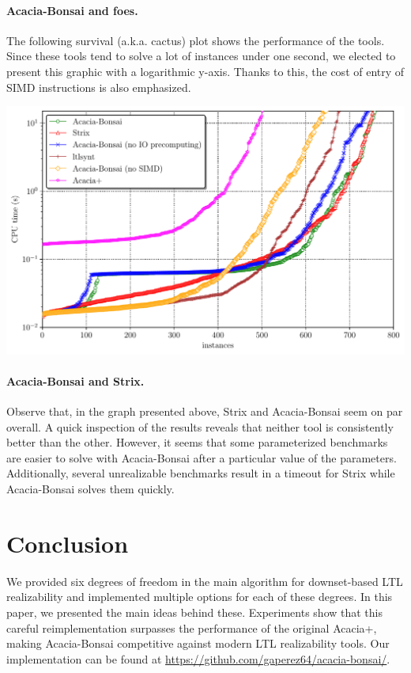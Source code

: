 \documentclass[runningheads,a4paper]{llncs}
\begin{document}
\paragraph{Acacia-Bonsai and foes.}  The following survival (a.k.a. cactus)
plot shows the performance of the tools.  Since these tools tend to solve a
lot of instances under one second, we elected to present this graphic with a
logarithmic y-axis.  Thanks to this, the cost of entry of SIMD instructions is
also emphasized.

\begin{center}
\includegraphics[width=\textwidth]{cactus}
\end{center}

\paragraph{Acacia-Bonsai and Strix.} Observe that, in the graph presented
above, Strix and Acacia-Bonsai seem on par overall. A quick inspection of the
results reveals that neither tool is consistently better than the other.
However, it seems that some parameterized benchmarks are
easier to solve with Acacia-Bonsai after a particular value of the parameters.
Additionally, several unrealizable benchmarks result in a timeout for Strix
while Acacia-Bonsai solves them quickly.



\section{Conclusion}

We provided six degrees of freedom in the main algorithm for downset-based LTL
realizability and implemented multiple options for each of these degrees.  In
this paper, we presented the main ideas behind these.  Experiments show that
this careful reimplementation surpasses the performance of the original
Acacia+, making Acacia-Bonsai competitive against modern LTL realizability
tools. Our implementation can be found at \url{https://github.com/gaperez64/acacia-bonsai/}.
\end{document}

